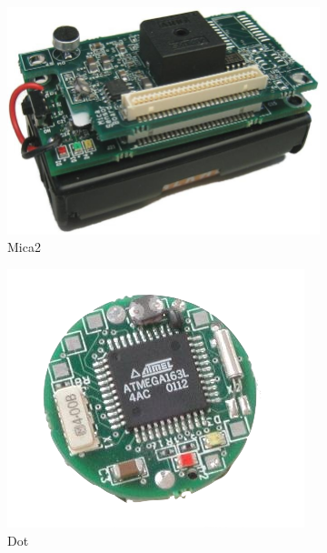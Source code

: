 \begin{figure}[h]
\centering
\begin{subfigure}{.24\textwidth}
  \centering
  \includegraphics[width=.9\linewidth]{./resources/mica2.jpg}
  \caption{Mica2}
  \label{fig:mica2}
\end{subfigure}
\begin{subfigure}{.24\textwidth}
  \centering
  \includegraphics[width=.9\linewidth]{./resources/dot.png}
  \caption{Dot}
  \label{fig:dot}
\end{subfigure}
\begin{subfigure}{.24\textwidth}
  \centering

\end{subfigure}
\end{figure}
